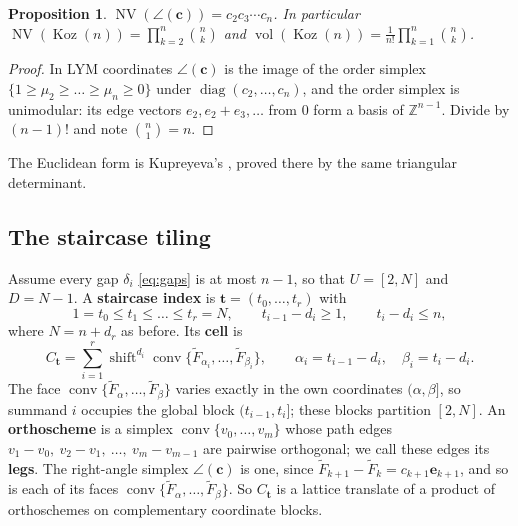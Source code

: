 \documentclass[11pt, a4paper, abstract=yes]{scrartcl}
\theoremstyle{definition}
\theoremstyle{remark}
\theoremstyle{plain}
\newtheorem{proposition}[definition]{Proposition}
\newcommand{\vek}[1]{\boldsymbol{#1}}
\theoremstyle{remark}
\theoremstyle{plain}
\newcommand{\Koz}{\operatorname{Koz}}
\newcommand{\shift}{\operatorname{shift}}
\newcommand{\conv}{\operatorname{conv}}
\newcommand{\rasimp}{\angle}
\newcommand{\NV}{\operatorname{NV}}
\newcommand{\vol}{\operatorname{vol}}
\newcommand{\leanpartial}{\tikz[baseline=-0.6ex]{\fill[leanfull] (0,-0.6ex) arc (-90:90:0.6ex) -- cycle;\draw[leanfull,line width=0.5pt] (0,0) circle (0.6ex);}}
\newcommand{\leanmark}[1]{\leavevmode{\reversemarginpar\marginnote{\raggedleft#1}}}
\begin{document}
\begin{proposition}
\leanmark{\leanpartial}\(\NV(\rasimp(\vek c))=c_2c_3\cdots c_n\). In particular \(\NV(\Koz(n))=\prod_{k=2}^n\binom nk\) and
\(\vol(\Koz(n))=\frac1{n!}\prod_{k=1}^n\binom nk\).
\label{prop-simplex-volume}
\end{proposition}

\begin{proof}
In LYM coordinates \(\rasimp(\vek c)\) is the image of the order simplex
\(\lbrace1\ge\mu_2\ge\dots\ge\mu_n\ge0\rbrace\) under \(\operatorname{diag}(c_2,\dots,c_n)\), and the order
simplex is unimodular: its edge vectors \(e_2,e_2+e_3,\dots\) from \(0\) form a basis of
\(\mathbb Z^{n-1}\). Divide by \((n-1)!\) and note \(\binom n1=n\).
\end{proof}

The Euclidean form is Kupreyeva's \autocite[Section 6.1]{Kupreyeva2019}, proved there by the same
triangular determinant.
\subsection{The staircase tiling}
\label{sec:org08ff84c}

Assume every gap \(\delta_i\) \eqref{eq:gaps} is at most \(n-1\), so that \(U=[2,N]\) and \(D=N-1\). A
\textbf{staircase index} is \(\vek t=(t_0,\dots,t_r)\) with
\begin{equation}\label{eq:staircase-index}
  1=t_0\le t_1\le\dots\le t_r=N,\qquad t_{i-1}-d_i\ge1,\qquad t_i-d_i\le n ,
\end{equation}
where \(N=n+d_r\) as before. Its \textbf{cell} is
\begin{equation}\label{eq:cell}
  C_{\vek t}=\sum_{i=1}^r\shift^{d_i}\conv\lbrace\tilde F_{\alpha_i},\dots,\tilde F_{\beta_i}\rbrace,
  \qquad \alpha_i=t_{i-1}-d_i,\quad \beta_i=t_i-d_i .
\end{equation}
The face
\(\conv\lbrace\tilde F_\alpha,\dots,\tilde F_\beta\rbrace\) varies exactly in the own coordinates
\((\alpha,\beta]\), so summand \(i\) occupies the global block \((t_{i-1},t_i]\); these blocks partition
\([2,N]\). An \textbf{orthoscheme} is a simplex \(\conv\lbrace v_0,\dots,v_m\rbrace\) whose path edges
\(v_1-v_0,\ v_2-v_1,\ \dots,\ v_m-v_{m-1}\) are pairwise orthogonal; we call these edges its
\textbf{legs}. The
right-angle simplex \(\rasimp(\vek c)\) is one, since \(\tilde F_{k+1}-\tilde F_k=c_{k+1}\vek e_{k+1}\),
and so is each of its faces \(\conv\lbrace\tilde F_\alpha,\dots,\tilde F_\beta\rbrace\). So
\(C_{\vek t}\) is a lattice translate of a product of orthoschemes on complementary coordinate blocks.
\end{document}
